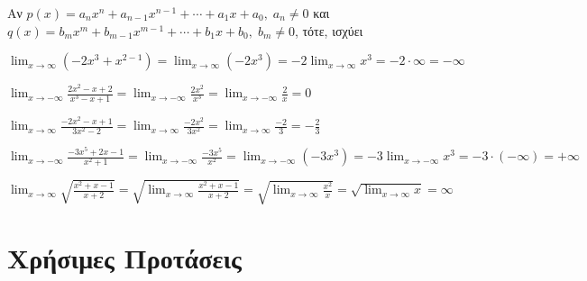 \begin{prop}
  Αν $ p(x) = a_{n} x^{n} + a_{n-1}x^{n-1}+\cdots + a_{1}x + a_{0}, \; a_{n} \neq 0  $ 
  και $ q(x) = b_{m} x^{m} + b_{m-1}x^{m-1}+\cdots + b_{1}x + b_{0}, \; b_{m} \neq 0 $, 
  τότε, ισχύει 
  \begin{center}
  \end{center}
\end{prop}

\begin{example}
  $ \lim_{x \to \infty} (-2x^{3}+x^{2-1}) = \lim_{x \to \infty} (-2x^{3}) = -2
  \lim_{x \to \infty} x^{3} = -2 \cdot \infty = - \infty $
\end{example}
\begin{example}
  $ \lim_{x \to - \infty} \frac{2x^{2}-x+2}{x^{3}-x+1} = \lim_{x \to - \infty}
  \frac{2 x^{2}}{x^{3}} = \lim_{x \to - \infty} \frac{2}{x} = 0 $
\end{example}
\begin{example}
  $ \lim_{x \to \infty} \frac{-2x^{2}-x+1}{3x^{2}-2} = \lim_{x \to \infty}
  \frac{-2 x^{2}}{3 x^{2}} = \lim_{x \to \infty} \frac{-2}{3} = - 
  \frac{2}{3} $ 
\end{example}
\begin{example}
  $ \lim_{x \to - \infty} \frac{-3x^{5}+2x-1}{x^{2}+1} = \lim_{x \to - \infty}
  \frac{-3x^{5}}{x^{2}} = \lim_{x \to - \infty} (-3x^{3}) = -3 \lim_{x \to - \infty}
  x^{3} = -3 \cdot (- \infty) = + \infty $
\end{example}
\begin{example}
$ \lim_{x \to \infty} \sqrt{\frac{x^{2}+x-1}{x+2}} = \sqrt{\lim_{x \to \infty}
\frac{x^{2}+x-1}{x+2}} = \sqrt{\lim_{x \to \infty} \frac{x^{2}}{x}} = \sqrt{\lim_{x \to 
  \infty} x} = \infty $
  \end{example}


\section{Χρήσιμες Προτάσεις}

